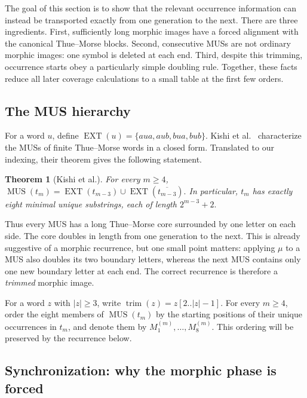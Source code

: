 \documentclass[10pt,a4paper]{article}
\newtheorem{theorem}{Theorem}[section]
\theoremstyle{definition}\newtheorem{definition}[theorem]{Definition}
\theoremstyle{remark}\newtheorem{remark}[theorem]{Remark}
\newcommand{\MUS}{\operatorname{MUS}}
\begin{document}
The goal of this section is to show that the relevant occurrence information can instead be transported exactly from one generation to the next. There are three ingredients. First, sufficiently long morphic images have a forced alignment with the canonical Thue--Morse blocks. Second, consecutive MUSs are not ordinary morphic images: one symbol is deleted at each end. Third, despite this trimming, occurrence starts obey a particularly simple doubling rule. Together, these facts reduce all later coverage calculations to a small table at the first few orders.

\subsection{The MUS hierarchy}
\label{subsec:mus-hierarchy}

For a word $u$, define
$
\operatorname{EXT}(u)=\{aua,aub,bua,bub\}.
$
Kishi et al.~\cite{Kishi2026} characterize the MUSs of finite Thue--Morse words in a closed form. Translated to our indexing, their theorem gives the following statement.

\begin{theorem}[Kishi et al.]
\label{thm:kishi-mus}
For every $m\ge4$,
$
\MUS(t_m)=\operatorname{EXT}(t_{m-3})\cup
\operatorname{EXT}(\overline{t_{m-3}}).
$
In particular, $t_m$ has exactly eight minimal unique substrings, each of length
$
2^{m-3}+2.
$
\end{theorem}

Thus every MUS has a long Thue--Morse core surrounded by one letter on each side. The core doubles in length from one generation to the next. This is already suggestive of a morphic recurrence, but one small point matters: applying $\mu$ to a MUS also doubles its two boundary letters, whereas the next MUS contains only one new boundary letter at each end. The correct recurrence is therefore a \emph{trimmed} morphic image.

For a word $z$ with $|z|\ge3$, write
$
\operatorname{trim}(z)=z[2..|z|-1].
$
For every $m\ge4$, order the eight members of $\MUS(t_m)$ by the starting positions of their unique occurrences in $t_m$, and denote them by
$
M_1^{(m)},\ldots,M_8^{(m)}.
$
This ordering will be preserved by the recurrence below.

\subsection{Synchronization: why the morphic phase is forced}
\label{subsec:synchronization}
\end{document}
